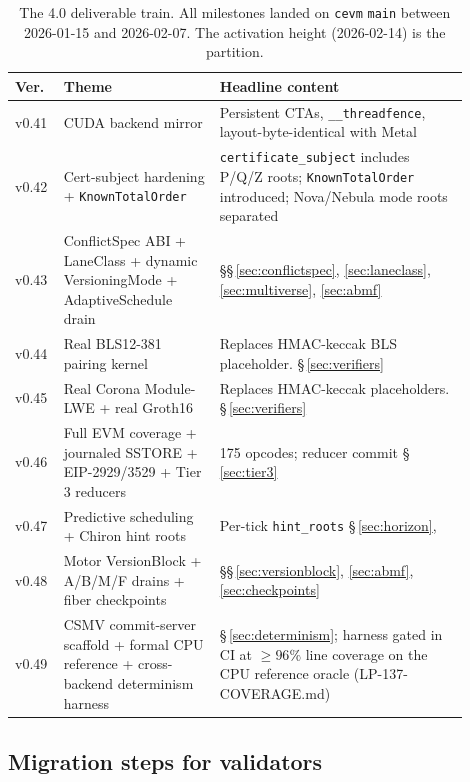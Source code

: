\begin{table}[ht]
\centering
\small
\caption{The 4.0 deliverable train. All milestones landed on
\texttt{cevm} \texttt{main} between 2026-01-15 and 2026-02-07. The
activation height (2026-02-14) is the partition.}
\label{tab:roadmap}
\begin{tabular}{p{0.07\linewidth}p{0.32\linewidth}p{0.51\linewidth}}
\toprule
\textbf{Ver.} & \textbf{Theme} & \textbf{Headline content} \\
\midrule
v0.41 & CUDA backend mirror & Persistent CTAs, \texttt{\_\_threadfence}, layout-byte-identical with Metal \\
v0.42 & Cert-subject hardening + \texttt{KnownTotalOrder} & \texttt{certificate\_subject} includes P/Q/Z roots; \texttt{KnownTotalOrder} introduced; Nova/Nebula mode roots separated \\
v0.43 & ConflictSpec ABI + LaneClass + dynamic VersioningMode + AdaptiveSchedule drain & \S\S\,\ref{sec:conflictspec}, \ref{sec:laneclass}, \ref{sec:multiverse}, \ref{sec:abmf} \\
v0.44 & Real BLS12-381 pairing kernel & Replaces HMAC-keccak BLS placeholder. \S\,\ref{sec:verifiers} \\
v0.45 & Real Corona Module-LWE + real Groth16 & Replaces HMAC-keccak placeholders. \S\,\ref{sec:verifiers} \\
v0.46 & Full EVM coverage + journaled SSTORE + EIP-2929/3529 + Tier 3 reducers & 175 opcodes; reducer commit \S\,\ref{sec:tier3} \\
v0.47 & Predictive scheduling + Chiron hint roots & Per-tick \texttt{hint\_roots} \S\,\ref{sec:horizon}, \cite{chiron2025} \\
v0.48 & Motor VersionBlock + A/B/M/F drains + fiber checkpoints & \S\S\,\ref{sec:versionblock}, \ref{sec:abmf}, \ref{sec:checkpoints} \\
v0.49 & CSMV commit-server scaffold + formal CPU reference + cross-backend determinism harness & \S\,\ref{sec:determinism}; harness gated in CI at $\geq 96\%$ line coverage on the CPU reference oracle (LP-137-COVERAGE.md) \\
\bottomrule
\end{tabular}
\end{table}

\subsection{Migration steps for validators}

